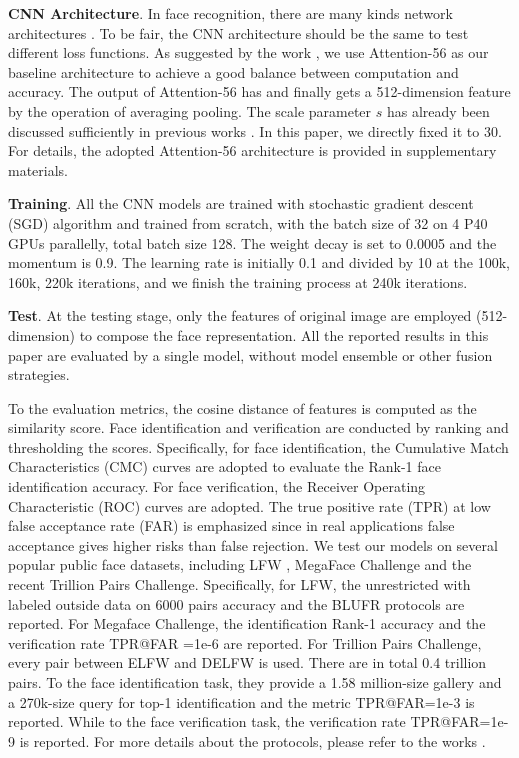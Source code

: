 \documentclass[10pt,twocolumn,letterpaper]{article}
\begin{document}
\noindent \textbf{CNN Architecture}. In face recognition, there are many kinds network architectures \cite{SphereFace,AM-Softmax,wang2018devil}. To be fair, the CNN architecture should be the same to test different loss functions. As suggested by the work \cite{wang2018devil}, we use Attention-56 \cite{Attention56} as our baseline architecture to achieve a good balance between computation and accuracy. The output of Attention-56 has and finally gets a 512-dimension feature by the operation of averaging pooling. The scale parameter $s$ has already been discussed sufficiently in previous works \cite{AM-Softmax,cosface}. In this paper, we directly fixed it to 30. For details, the adopted Attention-56 architecture is provided in supplementary materials.






\noindent \textbf{Training}. All the CNN models are trained with stochastic gradient descent (SGD) algorithm and trained from scratch, with the batch size of 32 on 4 P40 GPUs parallelly, total batch size 128. The weight decay is set to 0.0005 and the momentum is 0.9. The learning rate is initially 0.1 and divided by 10 at the 100k, 160k, 220k iterations, and we finish the training process at 240k iterations.

\noindent \textbf{Test}. At the testing stage, only the features of original image are employed (512-dimension) to compose the face representation. All the reported results in this paper are evaluated by a single model, without model ensemble or other fusion strategies.

To the evaluation metrics, the cosine distance of features is computed as the similarity score. Face identification and verification are conducted by ranking and thresholding the scores. Specifically, for face identification, the Cumulative Match Characteristics (CMC) curves are adopted to evaluate the Rank-1 face identification accuracy. For face verification, the Receiver Operating Characteristic (ROC) curves are adopted. The true positive rate (TPR) at low false acceptance rate (FAR) is emphasized since in real applications false acceptance gives higher risks than false rejection. We test our models on several popular public face datasets, including LFW \cite{LFW}, MegaFace Challenge \cite{megaface_1,megaface_2} and the recent Trillion Pairs Challenge. Specifically, for LFW, the unrestricted with labeled outside data on 6000 pairs accuracy \cite{LFW} and the BLUFR \cite{blufr} protocols are reported. For Megaface Challenge, the identification Rank-1 accuracy and the verification rate TPR@FAR =1e-6 are reported. For Trillion Pairs Challenge, every pair between ELFW and DELFW is used. There are in total 0.4 trillion pairs. To the face identification task, they provide a 1.58 million-size gallery and a 270k-size query for top-1 identification and the metric TPR@FAR=1e-3 is reported. While to the face verification task, the verification rate TPR@FAR=1e-9 is reported. For more details about the protocols, please refer to the works \cite{LFW,blufr,megaface_1}.
\end{document}
